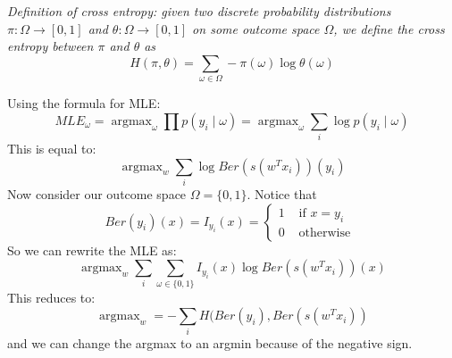 \documentclass{article}
\begin{document}
\begin{itemize}
\begin{itemize}
                \textit{Definition of cross entropy: given two discrete probability distributions $\pi : \Omega \rightarrow [0, 1]$ and $\theta : \Omega \rightarrow [0, 1]$ on some outcome space $\Omega$, we define the cross entropy between $\pi$ and $\theta$ as}
                    \begin{equation*}
                        H(\pi, \theta) = \sum_{\omega \in \Omega} -\pi(\omega) \log{\theta(\omega)}
                    \end{equation*}
                    \begin{answer}
                        Using the formula for MLE:
                            \begin{equation*}
                                MLE_{\omega} = \mathop{argmax}_{\omega}\prod p(y_{i} \mid \omega) = \mathop{argmax}_{\omega} \sum_{i} \log{p(y_{i} \mid \omega)}
                            \end{equation*}
                        This is equal to:
                            \begin{equation*}
                                \mathop{argmax}_{w} \sum_{i} \log{Ber(s(w^{T}x_{i}))(y_{i})}
                            \end{equation*}
                        Now consider our outcome space $\Omega = \{0, 1\}$. Notice that 
                            \begin{equation*}
                                Ber(y_{i})(x) = I_{y_{i}}(x) = \begin{cases}
                                    1 &\text{ if } x = y_{i} \\
                                    0 &\text{ otherwise }     
                                \end{cases}
                            \end{equation*}
                        So we can rewrite the MLE as:
                            \begin{equation*}
                                \mathop{argmax}_{w} \sum_{i} \sum_{\omega \in \{0, 1\}} I_{y_{i}}(x) \log{Ber(s(w^{T}x_{i}))(x)}
                            \end{equation*}
                        This reduces to:
                            \begin{equation*}
                                \mathop{argmax}_{w} = -\sum_{i} H(Ber(y_{i}), Ber(s(w^{T}x_{i}))
                            \end{equation*}
                        and we can change the argmax to an argmin because of the negative sign.
                    \end{answer}


\end{itemize}
\end{itemize}
\end{document}

